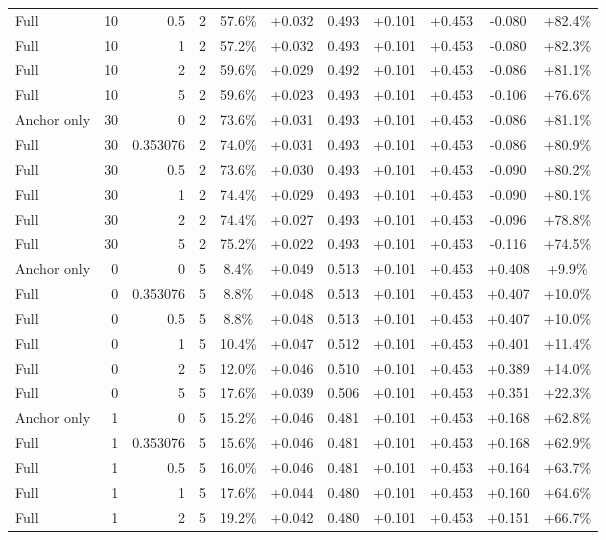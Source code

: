 \begin{table}[htbp]
\begin{tabular}{lrrrccccccc}
Full & 10 & 0.5 & 2 & 57.6\% & +0.032 & 0.493 & +0.101 & +0.453 & -0.080 & +82.4\% \\
Full & 10 & 1 & 2 & 57.2\% & +0.032 & 0.493 & +0.101 & +0.453 & -0.080 & +82.3\% \\
Full & 10 & 2 & 2 & 59.6\% & +0.029 & 0.492 & +0.101 & +0.453 & -0.086 & +81.1\% \\
Full & 10 & 5 & 2 & 59.6\% & +0.023 & 0.493 & +0.101 & +0.453 & -0.106 & +76.6\% \\
Anchor only & 30 & 0 & 2 & 73.6\% & +0.031 & 0.493 & +0.101 & +0.453 & -0.086 & +81.1\% \\
Full & 30 & 0.353076 & 2 & 74.0\% & +0.031 & 0.493 & +0.101 & +0.453 & -0.086 & +80.9\% \\
Full & 30 & 0.5 & 2 & 73.6\% & +0.030 & 0.493 & +0.101 & +0.453 & -0.090 & +80.2\% \\
Full & 30 & 1 & 2 & 74.4\% & +0.029 & 0.493 & +0.101 & +0.453 & -0.090 & +80.1\% \\
Full & 30 & 2 & 2 & 74.4\% & +0.027 & 0.493 & +0.101 & +0.453 & -0.096 & +78.8\% \\
Full & 30 & 5 & 2 & 75.2\% & +0.022 & 0.493 & +0.101 & +0.453 & -0.116 & +74.5\% \\
Anchor only & 0 & 0 & 5 & 8.4\% & +0.049 & 0.513 & +0.101 & +0.453 & +0.408 & +9.9\% \\
Full & 0 & 0.353076 & 5 & 8.8\% & +0.048 & 0.513 & +0.101 & +0.453 & +0.407 & +10.0\% \\
Full & 0 & 0.5 & 5 & 8.8\% & +0.048 & 0.513 & +0.101 & +0.453 & +0.407 & +10.0\% \\
Full & 0 & 1 & 5 & 10.4\% & +0.047 & 0.512 & +0.101 & +0.453 & +0.401 & +11.4\% \\
Full & 0 & 2 & 5 & 12.0\% & +0.046 & 0.510 & +0.101 & +0.453 & +0.389 & +14.0\% \\
Full & 0 & 5 & 5 & 17.6\% & +0.039 & 0.506 & +0.101 & +0.453 & +0.351 & +22.3\% \\
Anchor only & 1 & 0 & 5 & 15.2\% & +0.046 & 0.481 & +0.101 & +0.453 & +0.168 & +62.8\% \\
Full & 1 & 0.353076 & 5 & 15.6\% & +0.046 & 0.481 & +0.101 & +0.453 & +0.168 & +62.9\% \\
Full & 1 & 0.5 & 5 & 16.0\% & +0.046 & 0.481 & +0.101 & +0.453 & +0.164 & +63.7\% \\
Full & 1 & 1 & 5 & 17.6\% & +0.044 & 0.480 & +0.101 & +0.453 & +0.160 & +64.6\% \\
Full & 1 & 2 & 5 & 19.2\% & +0.042 & 0.480 & +0.101 & +0.453 & +0.151 & +66.7\% \\

\end{tabular}
\end{table}
